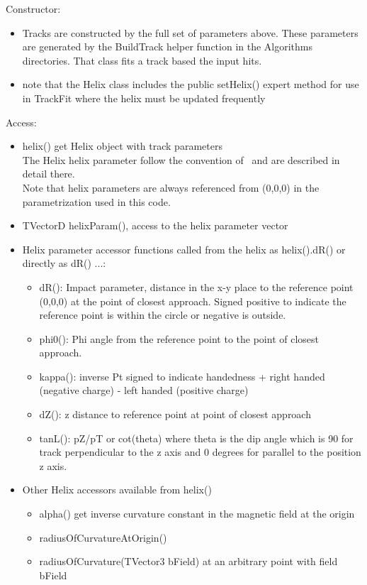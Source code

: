 \documentclass[aps,prd,superscriptaddress,floatfix]{revtex4}
\begin{document}
Constructor:
\begin{itemize}
\item Tracks are constructed by the full set of parameters above.  These parameters
are generated by the BuildTrack helper function in the Algorithms directories.
That class fits a track based the input hits.
\item note that the Helix class includes the public setHelix() expert method for use in TrackFit where the helix must be updated frequently
\end{itemize}


Access:
\begin{itemize}
\item helix() get Helix object with track parameters\\
The Helix helix parameter follow the convention of~\cite{helix} and are described in detail there.\\
Note that helix parameters are always referenced from (0,0,0) in the parametrization used in this code.
\item TVectorD helixParam(), access to the helix parameter vector
\item Helix parameter accessor functions called  from the helix as
  helix().dR() or directly as dR() ...:
\begin{itemize}
\item dR(): Impact parameter, distance in the x-y place to the reference point (0,0,0) at the point of closest
approach. Signed positive to indicate the reference point is within the circle or negative is outside.
\item phi0(): Phi angle from the reference point to the point of closest approach.
\item kappa(): inverse Pt signed to indicate handedness + right handed (negative charge) - left handed
(positive charge)
\item dZ(): z distance to reference point at point of closest approach
\item tanL(): pZ/pT or cot(theta) where theta is the dip angle which is 90 for track perpendicular
to the z axis and 0 degrees for parallel to the position z axis.
\end{itemize}
\item Other Helix accessors available from helix()
\begin{itemize}
\item alpha() get inverse curvature constant in the magnetic field at the origin
\item radiusOfCurvatureAtOrigin()
\item radiusOfCurvature(TVector3 bField) at an arbitrary point with field bField

\end{itemize}
\end{itemize}
\end{document}
